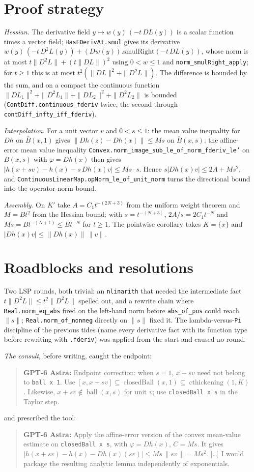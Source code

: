\documentclass[11pt]{article}
\newcommand{\code}[1]{\texttt{#1}}
\newcommand{\gptbox}[1]{\par\medskip\begin{quote}\small\textbf{\textcolor{green!50!black}{GPT-6 Astra:}} #1\end{quote}\medskip}
\begin{document}
\section{Proof strategy}

\emph{Hessian.} The derivative field $y \mapsto w(y)\,(-t\,DL(y))$ is a
scalar function times a vector field; \code{HasFDerivAt.smul} gives its
derivative $w(y)\,(-t\,D^2L(y)) + (Dw(y)).\mathrm{smulRight}(-t\,DL(y))$,
whose norm is at most $t\|D^2L\| + (t\|DL\|)^2$ using $0 < w \le 1$ and
\code{norm\_smulRight\_apply}; for $t \ge 1$ this is at most
$t^2(\|DL\|^2 + \|D^2L\|)$. The difference is bounded by the sum, and on
a compact the continuous function $\|DL_1\|^2 + \|D^2L_1\| + \|DL_2\|^2 +
\|D^2L_2\|$ is bounded (\code{ContDiff.continuous\_fderiv} twice, the
second through \code{contDiff\_infty\_iff\_fderiv}).

\emph{Interpolation.} For a unit vector $v$ and $0 < s \le 1$: the
mean value inequality for $Dh$ on $\overline{B}(x,1)$ gives $\|Dh(z) -
Dh(x)\| \le Ms$ on $\overline{B}(x,s)$; the affine-error mean value
inequality \code{Convex.norm\_image\_sub\_le\_of\_norm\_fderiv\_le'} on
$\overline{B}(x,s)$ with $\varphi = Dh(x)$ then gives $|h(x+sv) - h(x) -
s\,Dh(x)v| \le Ms\cdot s$. Hence $s|Dh(x)v| \le 2A + Ms^2$, and
\code{ContinuousLinearMap.opNorm\_le\_of\_unit\_norm} turns the
directional bound into the operator-norm bound.

\emph{Assembly.} On $K'$ take $A = C_1 t^{-(2N+3)}$ from the uniform
weight theorem and $M = Bt^2$ from the Hessian bound; with $s =
t^{-(N+3)}$, $2A/s = 2C_1 t^{-N}$ and $Ms = B t^{-(N+1)} \le B t^{-N}$
for $t \ge 1$. The pointwise corollary takes $K = \{x\}$ and
$|Dh(x)v| \le \|Dh(x)\|\,\|v\|$.

\section{Roadblocks and resolutions}

Two LSP rounds, both trivial: an \code{nlinarith} that needed the
intermediate fact $t\|D^2L\| \le t^2\|D^2L\|$ spelled out, and a rewrite
chain where \code{Real.norm\_eq\_abs} fired on the left-hand norm before
\code{abs\_of\_pos} could reach $\|s\|$; \code{Real.norm\_of\_nonneg}
directly on $\|s\|$ fixed it. The lambda-versus-\code{Pi} discipline of
the previous tides (name every derivative fact with its function type
before rewriting with \code{.fderiv}) was applied from the start and
caused no round.

\emph{The consult}, before writing, caught the endpoint:
\gptbox{Endpoint correction: when $s = 1$, $x + sv$ need not belong to
\code{ball x 1}. Use $[x, x + sv] \subseteq \operatorname{closedBall}(x,1)
\subseteq \operatorname{cthickening}(1,K)$. Likewise, $x + sv \notin
\operatorname{ball}(x,s)$ for unit $v$; use \code{closedBall x s} in the
Taylor step.}
and prescribed the tool:
\gptbox{Apply the affine-error version of the convex mean-value estimate
on \code{closedBall x s}, with $\varphi = Dh(x)$, $C = Ms$. It gives
$|h(x+sv) - h(x) - Dh(x)(sv)| \le Ms\,\|sv\| = Ms^2$. [\ldots] I would
package the resulting analytic lemma independently of exponentials.}
\end{document}
